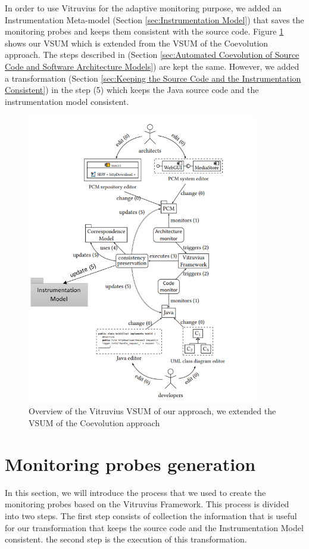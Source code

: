 In order to use Vitruvius for the adaptive monitoring purpose, we added an Instrumentation Meta-model (Section \ref{sec:Instrumentation Model}) that saves the monitoring probes and keeps them consistent with the source code. Figure \ref{fig:extended_vsum} shows our VSUM which is extended from the VSUM of the Coevolution approach. The steps described in (Section \ref{sec:Automated Coevolution of Source Code and Software Architecture Models}) are kept the same. However, we added a transformation (Section \ref{sec:Keeping the Source Code and the Instrumentation Consistent}) in the step (5) which keeps the Java source code and the instrumentation model consistent. 

\begin{figure}[h]
\centering
\includegraphics[width=0.9\textwidth]{figures/extended_vsum}
\caption{Overview of the Vitruvius VSUM of our approach, we extended the VSUM of the Coevolution approach}
\label{fig:extended_vsum}
\end{figure}

\section{Monitoring probes generation}
\label{sec:Monitoring probes generation}
In this section, we will introduce the process that we used to create the monitoring probes based on the Vitruvius Framework. This process is divided into two steps. The first step consists of collection the information that is useful for our transformation that keeps the source code and the Instrumentation Model consistent. the second step is the execution of this transformation.

